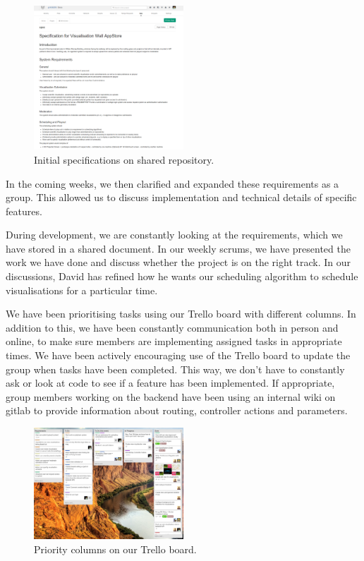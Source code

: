 \documentclass[a4paper]{article}
\begin{document}
\begin{figure}[h!]
  \centering
    \includegraphics[width = 0.5\textwidth]{./evaluation/specs.png}

  \caption{Initial specifications on shared repository.}
  \label{fig:specs}
\end{figure}



In the coming weeks, we then clarified and expanded these requirements as 
a group. This allowed us to discuss implementation and technical details
of specific features.

During development, we are constantly looking at the requirements, which 
we have stored in a shared document. In our weekly scrums, we have 
presented the work we have done and discuss whether the project is on the 
right track. In our discussions, David has refined how he wants our
scheduling algorithm to schedule visualisations for a particular time. 

We have been prioritising tasks using our Trello board with different
columns. In addition to this, we have been constantly communication both 
in person and online, to make sure members are implementing assigned tasks
in appropriate times. We have been actively encouraging use of the Trello 
board to update the group when tasks have been completed. This way, 
we don't have to constantly ask or look at code to see if a feature has 
been implemented. If appropriate, group members working on the backend
have been using an internal wiki on gitlab to provide information about
routing, controller actions and parameters. 


\begin{figure}[h!]
  \centering
    \includegraphics[width = 0.5\textwidth]{./evaluation/trello-columns.png}

  \caption{Priority columns on our Trello board.}
  \label{fig:columns}
\end{figure}
\end{document}
